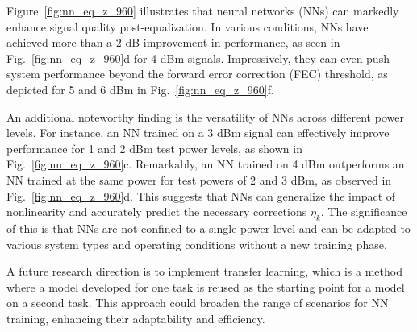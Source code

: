 
Figure~\ref{fig:nn_eq_z_960} illustrates that neural networks (NNs) can markedly enhance signal quality post-equalization. In various conditions, NNs have achieved more than a 2 dB improvement in performance, as seen in Fig.~\ref{fig:nn_eq_z_960}d for 4 dBm signals. Impressively, they can even push system performance beyond the forward error correction (FEC) threshold, as depicted for 5 and 6 dBm in Fig.~\ref{fig:nn_eq_z_960}f.

An additional noteworthy finding is the versatility of NNs across different power levels. For instance, an NN trained on a 3 dBm signal can effectively improve performance for 1 and 2 dBm test power levels, as shown in Fig.~\ref{fig:nn_eq_z_960}c. Remarkably, an NN trained on 4 dBm outperforms an NN trained at the same power for test powers of 2 and 3 dBm, as observed in Fig.~\ref{fig:nn_eq_z_960}d. This suggests that NNs can generalize the impact of nonlinearity and accurately predict the necessary corrections $\eta_k$. The significance of this is that NNs are not confined to a single power level and can be adapted to various system types and operating conditions without a new training phase.

A future research direction is to implement transfer learning, which is a method where a model developed for one task is reused as the starting point for a model on a second task. This approach could broaden the range of scenarios for NN training, enhancing their adaptability and efficiency.



